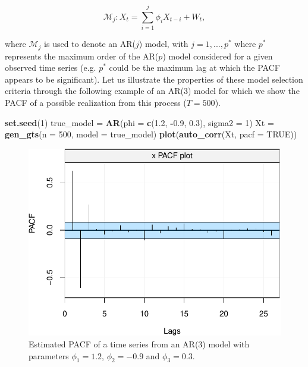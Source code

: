 \documentclass[]{book}
\newenvironment{Shaded}{\begin{snugshade}}{\end{snugshade}}
\newcommand{\KeywordTok}[1]{\textcolor[rgb]{0.13,0.29,0.53}{\textbf{#1}}}
\newcommand{\DataTypeTok}[1]{\textcolor[rgb]{0.13,0.29,0.53}{#1}}
\newcommand{\DecValTok}[1]{\textcolor[rgb]{0.00,0.00,0.81}{#1}}
\newcommand{\FloatTok}[1]{\textcolor[rgb]{0.00,0.00,0.81}{#1}}
\newcommand{\StringTok}[1]{\textcolor[rgb]{0.31,0.60,0.02}{#1}}
\newcommand{\OtherTok}[1]{\textcolor[rgb]{0.56,0.35,0.01}{#1}}
\newcommand{\OperatorTok}[1]{\textcolor[rgb]{0.81,0.36,0.00}{\textbf{#1}}}
\newcommand{\NormalTok}[1]{#1}
\theoremstyle{definition}
\theoremstyle{definition}
\theoremstyle{definition}
\theoremstyle{remark}
\begin{document}
\[\mathcal{M}_j: {X_t} = \sum\limits_{i = 1}^j {{\phi _i}{X_{t - i}}}  + {W_t},\]

where \(\mathcal{M}_j\) is used to denote an AR(\(j\)) model, with
\(j = 1,...,p^*\) where \(p^*\) represents the maximum order of the
AR(\(p\)) model considered for a given observed time series (e.g.
\(p^*\) could be the maximum lag at which the PACF appears to be
significant). Let us illustrate the properties of these model selection
criteria through the following example of an AR(3) model for which we
show the PACF of a possible realization from this process (\(T = 500\)).

\begin{Shaded}
\begin{Highlighting}[]
\KeywordTok{set.seed}\NormalTok{(}\DecValTok{1}\NormalTok{)}
\NormalTok{true_model =}\StringTok{ }\KeywordTok{AR}\NormalTok{(}\DataTypeTok{phi =} \KeywordTok{c}\NormalTok{(}\FloatTok{1.2}\NormalTok{, }\OperatorTok{-}\FloatTok{0.9}\NormalTok{, }\FloatTok{0.3}\NormalTok{), }\DataTypeTok{sigma2 =} \DecValTok{1}\NormalTok{)}
\NormalTok{Xt =}\StringTok{ }\KeywordTok{gen_gts}\NormalTok{(}\DataTypeTok{n =} \DecValTok{500}\NormalTok{, }\DataTypeTok{model =}\NormalTok{ true_model)}
\KeywordTok{plot}\NormalTok{(}\KeywordTok{auto_corr}\NormalTok{(Xt, }\DataTypeTok{pacf =} \OtherTok{TRUE}\NormalTok{))}
\end{Highlighting}
\end{Shaded}

\begin{figure}

{\centering \includegraphics{ts_files/figure-latex/unnamed-chunk-50-1} 

}

\caption{Estimated PACF of a time series from an AR(3) model with parameters $\phi_1 = 1.2$, $\phi_2 = -0.9$ and $\phi_3 = 0.3$.}\label{fig:unnamed-chunk-50}
\end{figure}
\end{document}
